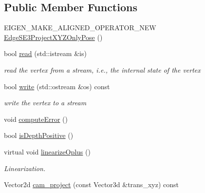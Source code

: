 \subsection*{Public Member Functions}
\begin{DoxyCompactItemize}
\item 
E\+I\+G\+E\+N\+\_\+\+M\+A\+K\+E\+\_\+\+A\+L\+I\+G\+N\+E\+D\+\_\+\+O\+P\+E\+R\+A\+T\+O\+R\+\_\+\+N\+EW \mbox{\hyperlink{classg2o_1_1_edge_s_e3_project_x_y_z_only_pose_a617972556497ab31cc745f6d3eb59c58}{Edge\+S\+E3\+Project\+X\+Y\+Z\+Only\+Pose}} ()
\item 
bool \mbox{\hyperlink{classg2o_1_1_edge_s_e3_project_x_y_z_only_pose_a28994ddf2cab7b61566ce55ad4b43388}{read}} (std\+::istream \&is)
\begin{DoxyCompactList}\small\item\em read the vertex from a stream, i.\+e., the internal state of the vertex \end{DoxyCompactList}\item 
bool \mbox{\hyperlink{classg2o_1_1_edge_s_e3_project_x_y_z_only_pose_ac0132c975af1a49cdf490a6dbe8f450c}{write}} (std\+::ostream \&os) const
\begin{DoxyCompactList}\small\item\em write the vertex to a stream \end{DoxyCompactList}\item 
void \mbox{\hyperlink{classg2o_1_1_edge_s_e3_project_x_y_z_only_pose_a6752098d3322d30e43a6a3a668a3b009}{compute\+Error}} ()
\item 
bool \mbox{\hyperlink{classg2o_1_1_edge_s_e3_project_x_y_z_only_pose_abd6f619de5af8855c8ee21fcfad51c9e}{is\+Depth\+Positive}} ()
\item 
virtual void \mbox{\hyperlink{classg2o_1_1_edge_s_e3_project_x_y_z_only_pose_abe6d775aade1277786274c328aa2c38b}{linearize\+Oplus}} ()
\begin{DoxyCompactList}\small\item\em Linearization. \end{DoxyCompactList}\item 
Vector2d \mbox{\hyperlink{classg2o_1_1_edge_s_e3_project_x_y_z_only_pose_ad557e880209ef1a49c4b54a60872fe68}{cam\+\_\+project}} (const Vector3d \&trans\+\_\+xyz) const
\end{DoxyCompactItemize}
